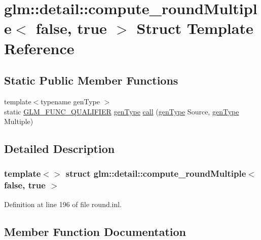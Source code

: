 \hypertarget{structglm_1_1detail_1_1compute__round_multiple_3_01false_00_01true_01_4}{}\section{glm\+::detail\+::compute\+\_\+round\+Multiple$<$ false, true $>$ Struct Template Reference}
\label{structglm_1_1detail_1_1compute__round_multiple_3_01false_00_01true_01_4}
\subsection*{Static Public Member Functions}
\begin{DoxyCompactItemize}
\item 
{\footnotesize template$<$typename gen\+Type $>$ }\\static \mbox{\hyperlink{setup_8hpp_a33fdea6f91c5f834105f7415e2a64407}{G\+L\+M\+\_\+\+F\+U\+N\+C\+\_\+\+Q\+U\+A\+L\+I\+F\+I\+ER}} \mbox{\hyperlink{structglm_1_1detail_1_1gen_type}{gen\+Type}} \mbox{\hyperlink{structglm_1_1detail_1_1compute__round_multiple_3_01false_00_01true_01_4_a9f9791732bf5427c856feac9fed810da}{call}} (\mbox{\hyperlink{structglm_1_1detail_1_1gen_type}{gen\+Type}} Source, \mbox{\hyperlink{structglm_1_1detail_1_1gen_type}{gen\+Type}} Multiple)
\end{DoxyCompactItemize}


\subsection{Detailed Description}
\subsubsection*{template$<$$>$\newline
struct glm\+::detail\+::compute\+\_\+round\+Multiple$<$ false, true $>$}



Definition at line 196 of file round.\+inl.



\subsection{Member Function Documentation}
\mbox{\label{structglm_1_1detail_1_1compute__round_multiple_3_01false_00_01true_01_4_a9f9791732bf5427c856feac9fed810da}} 
